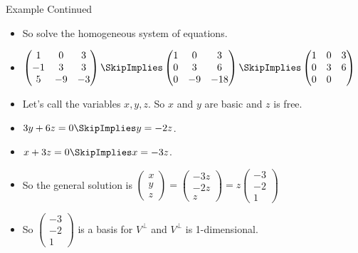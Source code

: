 \documentclass{beamer}
\begin{document}
\begin{frame}{Example Continued}
\begin{itemize}
\item So solve the homogeneous system of equations.
\item $
\begin{pmatrix}
1 & 0 & 3   \\
-1 & 3 & 3  \\
5 & -9 & -3
\end{pmatrix}
\SkipImplies
\begin{pmatrix}
1 & 0 & 3    \\
0 & 3 & 6    \\
0 & -9 & -18
\end{pmatrix}
\SkipImplies
\begin{pmatrix}
1 & 0 & 3    \\
0 & 3 & 6    \\
0 & 0 &
\end{pmatrix}
$
\item Let's call the variables $x,y,z$. So $x$ and $y$ are basic and $z$ is free.
\item $3y+6z=0\SkipImplies y = -2z$.
\item $x +3z =0 \SkipImplies x=-3z$.
\item So the general solution is $
\begin{pmatrix}
x\\y\\z
\end{pmatrix}
=
\begin{pmatrix}
-3z\\-2z\\z
\end{pmatrix}
=
z
\begin{pmatrix}
-3\\-2\\1
\end{pmatrix}
$
\item So $
\begin{pmatrix}
-3\\-2\\1
\end{pmatrix}
$
is a basis for $V^{\perp}$ and $V^{\perp}$ is 1-dimensional.
\end{itemize}
\end{frame}
\end{document}
